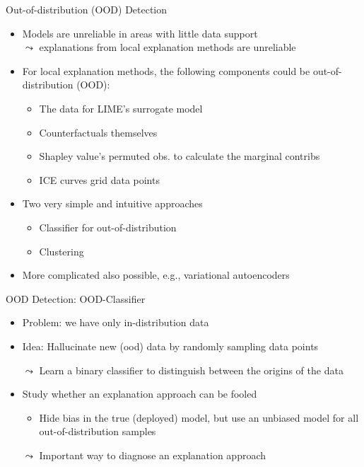 \documentclass[10pt,compress,t,notes=noshow, xcolor=table]{beamer}
\begin{document}
\begin{frame}[c]{Out-of-distribution (OOD) Detection}
	\begin{itemize}
		\item Models are unreliable in areas with little data support\\ $\leadsto$ explanations from local explanation methods are unreliable
		\pause
		\item For local explanation methods, the following components could be out-of-distribution (OOD): 
		\begin{itemize}
			\item The data for LIME's surrogate model
			\item Counterfactuals themselves
			\item Shapley value's permuted obs. to calculate the marginal contribs 
			\item ICE curves grid data points 
		\end{itemize}
		\pause
		\item Two very simple and intuitive approaches
		\begin{itemize}
		    \item Classifier for out-of-distribution
		    \item Clustering
		\end{itemize}
		\item More complicated also possible, e.g., variational autoencoders 
	\end{itemize}
\end{frame}


\begin{frame}[c]{OOD Detection: OOD-Classifier}
	\begin{itemize}
	    \item Problem: we have only in-distribution data
	    \item Idea: Hallucinate new (ood) data by randomly sampling data points
	    \item[$\leadsto$] Learn a binary classifier to distinguish between the origins of the data
	    \medskip
	    \pause
	    \item Study whether an explanation approach can be fooled 
	    \begin{itemize}
	        \item Hide bias in the true (deployed) model, but use an unbiased model for all out-of-distribution samples
	    \end{itemize}
	    \item[$\leadsto$] Important way to diagnose an explanation approach
	\end{itemize}
\end{frame}
\end{document}

